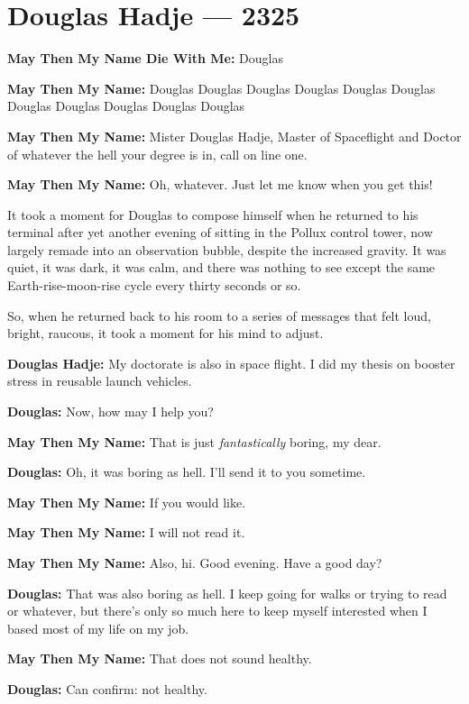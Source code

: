 \hypertarget{douglas-hadje-2325}{%
\chapter{Douglas Hadje — 2325}\label{douglas-hadje-2325}}

\textbf{May Then My Name Die With Me:} Douglas

\textbf{May Then My Name:} Douglas Douglas Douglas Douglas Douglas Douglas Douglas Douglas Douglas Douglas Douglas

\textbf{May Then My Name:} Mister Douglas Hadje, Master of Spaceflight and Doctor of whatever the hell your degree is in, call on line one.

\textbf{May Then My Name:} Oh, whatever. Just let me know when you get this!

It took a moment for Douglas to compose himself when he returned to his terminal after yet another evening of sitting in the Pollux control tower, now largely remade into an observation bubble, despite the increased gravity. It was quiet, it was dark, it was calm, and there was nothing to see except the same Earth-rise-moon-rise cycle every thirty seconds or so.

So, when he returned back to his room to a series of messages that felt loud, bright, raucous, it took a moment for his mind to adjust.

\textbf{Douglas Hadje:} My doctorate is also in space flight. I did my thesis on booster stress in reusable launch vehicles.

\textbf{Douglas:} Now, how may I help you?

\textbf{May Then My Name:} That is just \emph{fantastically} boring, my dear.

\textbf{Douglas:} Oh, it was boring as hell. I'll send it to you sometime.

\textbf{May Then My Name:} If you would like.

\textbf{May Then My Name:} I will not read it.

\textbf{May Then My Name:} Also, hi. Good evening. Have a good day?

\textbf{Douglas:} That was also boring as hell. I keep going for walks or trying to read or whatever, but there's only so much here to keep myself interested when I based most of my life on my job.

\textbf{May Then My Name:} That does not sound healthy.

\textbf{Douglas:} Can confirm: not healthy.

